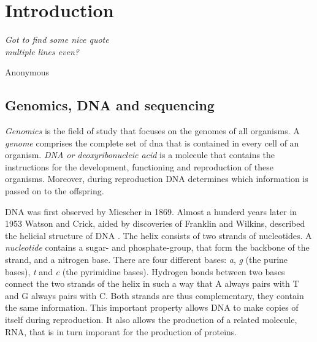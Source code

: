 \chapter{Introduction}\label{ch1}
\setlength{\epigraphrule}{0pt}
\setlength{\epigraphwidth}{0.75\textwidth}
\epigraph{\textit{Got to find some nice quote \\ multiple lines even?}}{Anonymous}

\section{Genomics, DNA and sequencing}

\emph{Genomics} is the field of study that focuses on the genomes of all organisms. A \emph{genome} comprises the complete set of \acrshort{dna} that is contained in every cell of an organism. \emph{DNA or deoxyribonucleic acid} is a molecule that contains the instructions for the development, functioning  and reproduction of these organisms. Moreover, during reproduction DNA determines which information is passed on to the offspring. 

DNA was first observed by Miescher in 1869. Almost a hunderd years later in 1953 Watson and Crick, aided by discoveries of Franklin and Wilkins, described the helicial structure of DNA \cite{Watson1953}. The helix consists of two strands of nucleotides. A \emph{nucleotide} contains a sugar- and phosphate-group, that form the backbone of the strand, and a nitrogen base. There are four different bases: \emph{\gls{a}}, \emph{\gls{g}} (the purine bases), \emph{\gls{t}} and \emph{\gls{c}} (the pyrimidine bases). Hydrogen bonds between two bases connect the two strands of the helix in such a way that A always pairs with T and G always pairs with C. Both strands are thus complementary, they contain the same information. This important property allows DNA to make copies of itself during reproduction. It also allows the production of a related molecule, RNA, that is in turn imporant for the production of prote\"ins. 


